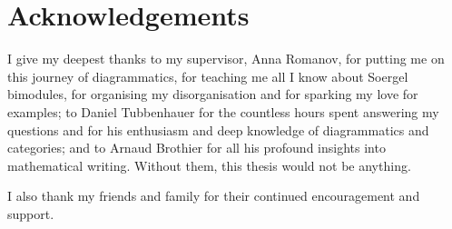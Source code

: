\chapter*{Acknowledgements}
\thispagestyle{empty}

I give my deepest thanks to my supervisor, Anna Romanov, for putting me on this journey of diagrammatics, for teaching me all I know about Soergel bimodules, for organising my disorganisation and for sparking my love for examples; to Daniel Tubbenhauer for the countless hours spent answering my questions and for his enthusiasm and deep knowledge of diagrammatics and categories; and to Arnaud Brothier for all his profound insights into mathematical writing. Without them, this thesis would not be anything.

I also thank my friends and family for their continued encouragement and support.

